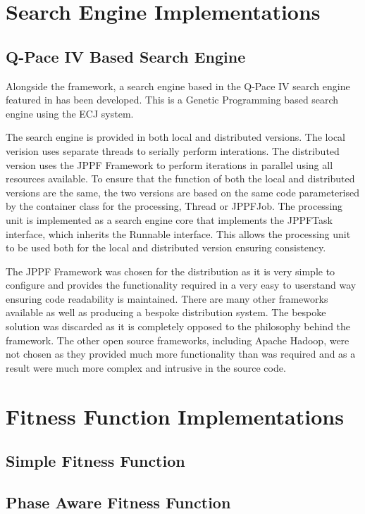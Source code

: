 \section{Search Engine Implementations}
\subsection{Q-Pace IV Based Search Engine}
Alongside the framework, a search engine based in the Q-Pace IV search engine featured in \cite{masseythesis} has been developed.
This is a Genetic Programming based search engine using the ECJ\cite{ecjtool} system.

The search engine is provided in both local and distributed versions.
The local verision uses separate threads to serially perform interations.
The distributed version uses the JPPF Framework to perform iterations in parallel using all resources available.
To ensure that the function of both the local and distributed versions are the same, the two versions are based on the same code parameterised by the container class for the processing, Thread or JPPFJob.
The processing unit is implemented as a search engine core that implements the JPPFTask interface, which inherits the Runnable interface.
This allows the processing unit to be used both for the local and distributed version ensuring consistency.

The JPPF Framework was chosen for the distribution as it is very simple to configure and provides the functionality required in a very easy to userstand way ensuring code readability is maintained.
There are many other frameworks available as well as producing a bespoke distribution system.
The bespoke solution was discarded as it is completely opposed to the philosophy behind the framework.
The other open source frameworks, including Apache Hadoop\cite{apahadoop}, were not chosen as they provided much more functionality than was required and as a result were much more complex and intrusive in the source code.


\section{Fitness Function Implementations}
\subsection{Simple Fitness Function}

\subsection{Phase Aware Fitness Function}

